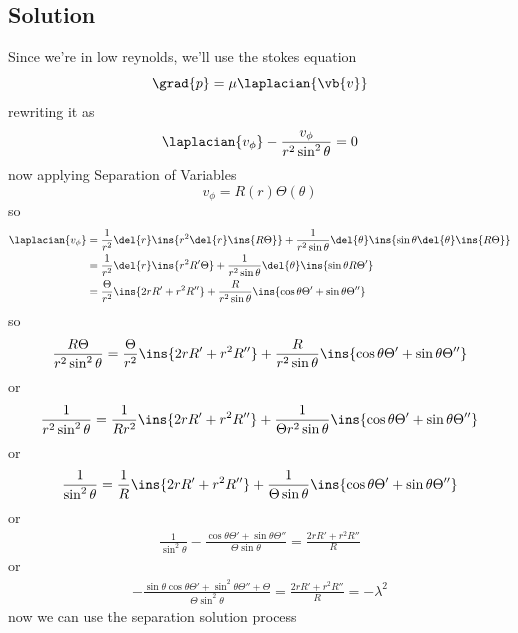 \subsection{Solution}
Since we're in low reynolds, we'll use the stokes equation 
\begin{equation}
    \grad{p} = \mu\laplacian{\vb{v}}
\end{equation}
rewriting it as 
\begin{equation}
    \laplacian{v_\phi} - \frac{v_\phi}{r^2\sin^2\theta}=0
\end{equation}
now applying Separation of Variables
\begin{equation}
    v_\phi = R(r)\Theta(\theta)
\end{equation}
so 
\begin{align}
    \laplacian{v_\phi} &= \frac{1}{r^2}\del{r}\ins{r^2\del{r}\ins{R\Theta}}+\frac{1}{r^2\sin\theta}\del{\theta}\ins{\sin\theta\del{\theta}\ins{R\Theta}}\\
    &= \frac{1}{r^2}\del{r}\ins{r^2R'\Theta}+\frac{1}{r^2\sin\theta}\del{\theta}\ins{\sin\theta R\Theta'}\\
    &= \frac{\Theta}{r^2}\ins{2rR'+r^2R''}+\frac{R}{r^2\sin\theta}\ins{\cos\theta \Theta'+\sin\theta \Theta''}
\end{align}
so 
\begin{align}
    \frac{R\Theta}{r^2\sin^2\theta}=\frac{\Theta}{r^2}\ins{2rR'+r^2R''}+\frac{R}{r^2\sin\theta}\ins{\cos\theta \Theta'+\sin\theta \Theta''}
\end{align}
or
\begin{align}
    \frac{1}{r^2\sin^2\theta}=\frac{1}{Rr^2}\ins{2rR'+r^2R''}+\frac{1}{\Theta r^2\sin\theta}\ins{\cos\theta \Theta'+\sin\theta \Theta''}
\end{align}
or 
\begin{align}
    \frac{1}{\sin^2\theta}=\frac{1}{R}\ins{2rR'+r^2R''}+\frac{1}{\Theta \sin\theta}\ins{\cos\theta \Theta'+\sin\theta \Theta''}
\end{align}
or
\begin{align}
    \frac{1}{\sin^2\theta}-\frac{\cos\theta \Theta'+\sin\theta \Theta''}{\Theta \sin\theta}=\frac{2rR'+r^2R''}{R}
\end{align}
or 
\begin{align}
    -\frac{\sin\theta\cos\theta \Theta'+\sin^2\theta \Theta''+\Theta}{\Theta \sin^2\theta}=\frac{2rR'+r^2R''}{R} = -\lambda^2
\end{align}
now we can use the separation solution process